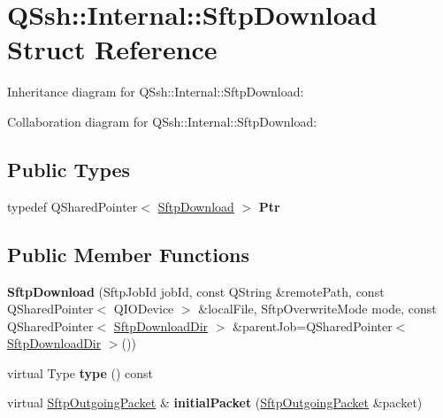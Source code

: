 \hypertarget{struct_q_ssh_1_1_internal_1_1_sftp_download}{}\section{Q\+Ssh\+:\+:Internal\+:\+:Sftp\+Download Struct Reference}
\label{struct_q_ssh_1_1_internal_1_1_sftp_download}


Inheritance diagram for Q\+Ssh\+:\+:Internal\+:\+:Sftp\+Download\+:


Collaboration diagram for Q\+Ssh\+:\+:Internal\+:\+:Sftp\+Download\+:
\subsection*{Public Types}
\begin{DoxyCompactItemize}
\item 
\mbox{\label{struct_q_ssh_1_1_internal_1_1_sftp_download_a2a61b783146353acaa9b0c5e86fe6767}} 
typedef Q\+Shared\+Pointer$<$ \mbox{\hyperlink{struct_q_ssh_1_1_internal_1_1_sftp_download}{Sftp\+Download}} $>$ {\bfseries Ptr}
\end{DoxyCompactItemize}
\subsection*{Public Member Functions}
\begin{DoxyCompactItemize}
\item 
\mbox{\label{struct_q_ssh_1_1_internal_1_1_sftp_download_ac8039da3b426e885341578ea1c9282f1}} 
{\bfseries Sftp\+Download} (Sftp\+Job\+Id job\+Id, const Q\+String \&remote\+Path, const Q\+Shared\+Pointer$<$ Q\+I\+O\+Device $>$ \&local\+File, Sftp\+Overwrite\+Mode mode, const Q\+Shared\+Pointer$<$ \mbox{\hyperlink{struct_q_ssh_1_1_internal_1_1_sftp_download_dir}{Sftp\+Download\+Dir}} $>$ \&parent\+Job=Q\+Shared\+Pointer$<$ \mbox{\hyperlink{struct_q_ssh_1_1_internal_1_1_sftp_download_dir}{Sftp\+Download\+Dir}} $>$())
\item 
\mbox{\label{struct_q_ssh_1_1_internal_1_1_sftp_download_a9f98ce2ad0f4356fca67e7ce66c1953f}} 
virtual Type {\bfseries type} () const
\item 
\mbox{\label{struct_q_ssh_1_1_internal_1_1_sftp_download_a821d59268b51243be6eb9262f1c7d931}} 
virtual \mbox{\hyperlink{class_q_ssh_1_1_internal_1_1_sftp_outgoing_packet}{Sftp\+Outgoing\+Packet}} \& {\bfseries initial\+Packet} (\mbox{\hyperlink{class_q_ssh_1_1_internal_1_1_sftp_outgoing_packet}{Sftp\+Outgoing\+Packet}} \&packet)
\end{DoxyCompactItemize}
